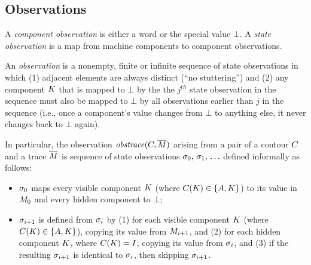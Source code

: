 \documentclass[conference]{IEEEtran}
\begin{document}
\subsection{Observations}


A {\em component observation} is either a word or the special value $\bot$.
A {\em state observation} is a map from machine components to component
observations.

An {\em observation} is a nonempty, finite or infinite sequence of state
observations in which (1) adjacent elements are always distinct (``no
stuttering'') and (2) any component $K$ that is mapped to $\bot$ by
the the $j^{th}$ state observation in the sequence must also be mapped to
$\bot$ by all observations earlier than $j$ in the sequence (i.e., once a
component's value changes from $\bot$ to anything else, it never changes
back to $\bot$ again).

In particular, the observation $\mathit{obstrace}(C, \overline{M})$
arising from a pair of a contour $C$ and a trace $\overline{M}$
is sequence of state observations $\sigma_0,\, \sigma_1,\,
\ldots$ defined informally as follows:
\begin{itemize}
\item $\sigma_0$ maps every visible component $K$ (where
  $C(K) \in \{A, K\}$) to its value in $M_0$
  and every hidden component to $\bot$;
\item $\sigma_{i+1}$ is defined from $\sigma_{i}$ by (1) for
  each visible component $K$ (where $C(K) \in
  \{A, K\}$), copying its value from $M_{i+1}$, and (2) for
  each hidden component $K$, where $C (K) =
  I$, copying its value from $\sigma_{i}$, and (3) if
  the resulting $\sigma_{i+1}$ is identical to $\sigma_{i}$,
  then skipping $\sigma_{i+1}$.  \iftext{}\fi
\end{itemize}
\end{document}
